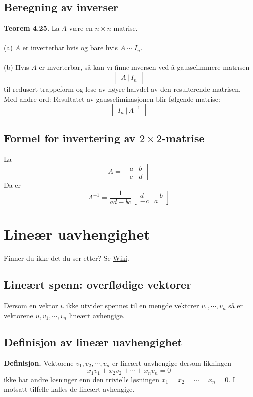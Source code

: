 \documentclass{article}
\begin{document}
\subsection{Beregning av inverser}
\textbf{Teorem 4.25.} La $A$ være en $n \times n$-matrise.\\\\
(a) $A$ er inverterbar hvis og bare hvis $A \sim I_n$.
\\\\
(b) Hvis $A$ er inverterbar, så kan vi finne inversen ved å gausseliminere matrisen
\[ \begin{bmatrix} A \ | \ I_n \end{bmatrix} \]
til redusert trappeform og lese av høyre halvdel av den resulterende matrisen. Med andre ord: Resultatet av gausseliminasjonen blir følgende matrise: 
\[ \begin{bmatrix} I_n \ | \ A^{-1} \end{bmatrix} \]

\subsection{Formel for invertering av $2 \times 2$-matrise}
La
\[ A = \begin{bmatrix} a & b \\ c & d \end{bmatrix} \]
Da er
\[ A^{-1} = \frac{1}{ad-bc} \, \begin{bmatrix} d & -b \\ -c & a \end{bmatrix} \]




\clearpage
\section{Lineær uavhengighet}
Finner du ikke det du ser etter? Se \href{https://www.math.ntnu.no/emner/TMA4110/2020h/notater/5-linear-uavhengighet.pdf}{Wiki}.


\subsection{Lineært spenn: overflødige vektorer}
Dersom en vektor $u$ ikke utvider spennet til en mengde vektorer $v_1, \cdots, v_n$ så er vektorene $u, v_1, \cdots, v_n$ lineært avhengige.


\subsection{Definisjon av lineær uavhengighet}
\textbf{Definisjon.} Vektorene $v_1, v_2, \cdots, v_n$ er lineært uavhengige dersom likningen
\[ x_1 v_1 + x_2 v_2 + \cdots + x_n v_n = 0 \]
ikke har andre løsninger enn den trivielle løsningen $x_1 = x_2 = \cdots = x_n = 0$. I motsatt tilfelle kalles de lineært avhengige.
\end{document}
